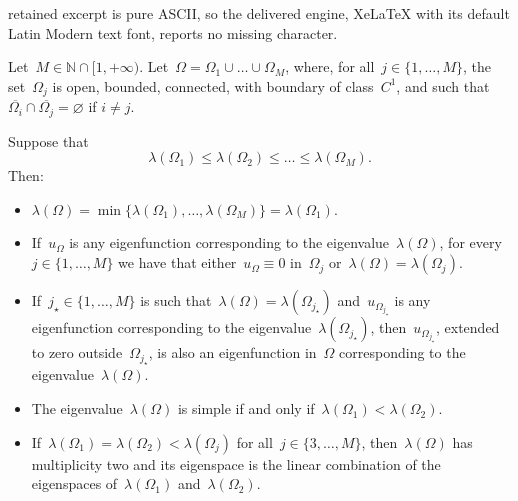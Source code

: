 \documentclass[10pt,a4paper]{amsart}
\def \N {\mathbb{N}}
\renewcommand{\emptyset}{\varnothing}
\renewcommand{\le}{\leqslant}
\begin{document}
retained excerpt is pure ASCII, so the delivered engine, XeLaTeX with its default Latin Modern text font, reports no missing character.
\begin{proposition}\label{PROPD1}
Let~$M\in\N\cap[1,+\infty)$.
Let~$\Omega=\Omega_1\cup\dots\cup\Omega_M$, where, for all~$j\in\{1,\dots,M\}$, the set~$\Omega_j$ is open, bounded, connected,
with boundary of class~$C^1$,
and such that~$\overline{\Omega_i}\cap\overline{ \Omega_j}=\emptyset$ if $i\neq j$. 

Suppose that
\begin{equation}\label{lammegmbmejp}
\lambda(\Omega_1)\le\lambda(\Omega_2)\le\dots\le\lambda(\Omega_M).\end{equation}
Then:
\begin{itemize}
\item[(i).] $\lambda(\Omega)=\min\{\lambda(\Omega_1),\dots,\lambda(\Omega_M)\}=\lambda(\Omega_1)$.
\item[(ii).] If~$u_\Omega$ is any eigenfunction corresponding to the eigenvalue~$\lambda(\Omega)$,
for every~$j\in\{1,\dots,M\}$ we have that either~$u_\Omega\equiv0$ in~$\Omega_j$
or~$\lambda(\Omega)=\lambda(\Omega_j)$.
\item[(iii).] If~$j_\star\in\{1,\dots,M\}$ is such that~$\lambda(\Omega)=\lambda(\Omega_{j_\star})$
and~$u_{\Omega_{j_\star}}$ is any eigenfunction corresponding to the eigenvalue~$\lambda(\Omega_{j_\star})$,
then~$u_{\Omega_{j_\star}}$, extended to zero outside~${\Omega_{j_\star}}$,
is also an eigenfunction in~$\Omega$ corresponding to the eigenvalue~$\lambda(\Omega)$.
\item[(iv).] The eigenvalue~$\lambda(\Omega)$ is simple if and only if~$\lambda(\Omega_1)<\lambda(\Omega_2)$.
\item[(v).] If~$\lambda(\Omega_1)=\lambda(\Omega_2)<\lambda(\Omega_j)$
for all~$j\in\{3,\dots,M\}$, then~$\lambda(\Omega)$ has multiplicity two and its eigenspace is the linear combination of the eigenspaces of~$\lambda(\Omega_1)$ and~$\lambda(\Omega_2)$.
\end{itemize}
\end{proposition}
\end{document}
